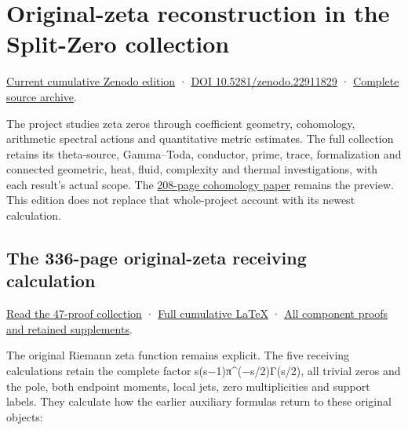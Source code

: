 \documentclass[
]{article}
\author{}
\date{}
\begin{document}
\section{Original-zeta reconstruction in the Split-Zero
collection}\label{original-zeta-reconstruction-in-the-split-zero-collection}

\href{https://zenodo.org/records/22911829}{Current cumulative Zenodo
edition} · \href{https://doi.org/10.5281/zenodo.22911829}{DOI
10.5281/zenodo.22911829} ·
\href{https://zenodo.org/records/22911829/files/175-splitzero-original-zeta-complete-sources.zip?download=1}{Complete
source archive}.

The project studies zeta zeros through coefficient geometry, cohomology,
arithmetic spectral actions and quantitative metric estimates. The full
collection retains its theta-source, Gamma--Toda, conductor, prime,
trace, formalization and connected geometric, heat, fluid, complexity
and thermal investigations, with each result's actual scope. The
\href{https://zenodo.org/records/22911829/files/154-splitzero-full-support-graph-pulses.pdf?download=1}{208-page
cohomology paper} remains the preview. This edition does not replace
that whole-project account with its newest calculation.

\subsection{The 336-page original-zeta receiving
calculation}\label{the-336-page-original-zeta-receiving-calculation}

\href{https://zenodo.org/records/22911829/files/173-splitzero-original-zeta-reconstruction.pdf?download=1}{Read
the 47-proof collection} ·
\href{https://github.com/KokunoYumeto/zeta-function-research-reader/blob/a8e35be8f238913ae5bcbd8ad55a07d539b350f3/workbenches/splitzero-tandem/branches/tau-zero-prime-positivity/TAU_ZERO_PRIME_POSITIVITY.tex}{Full
cumulative LaTeX} ·
\href{https://github.com/KokunoYumeto/zeta-function-research-reader/blob/a8e35be8f238913ae5bcbd8ad55a07d539b350f3/workbenches/splitzero-tandem/branches/tau-zero-prime-positivity/PUBLICATION_COMPANION.md}{All
component proofs and retained supplements}.

The original Riemann zeta function remains explicit. The five receiving
calculations retain the complete factor s(s−1)π\^{}(−s/2)Γ(s/2), all
trivial zeros and the pole, both endpoint moments, local jets, zero
multiplicities and support labels. They calculate how the earlier
auxiliary formulas return to these original objects:
\end{document}
